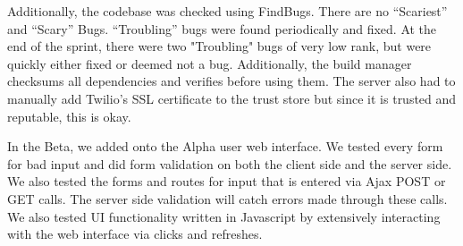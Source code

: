 \documentclass{article}
\begin{document}
\par Additionally, the codebase was checked using FindBugs. There are no ``Scariest'' and ``Scary'' Bugs. ``Troubling'' bugs were found periodically and fixed. At the end of the sprint, there were two "Troubling" bugs of very low rank, but were quickly either fixed or deemed not a bug. Additionally, the build manager checksums all dependencies and verifies before using them. The server also had to manually add Twilio's SSL certificate to the trust store but since it is trusted and reputable, this is okay.

\par In the Beta, we added onto the Alpha user web interface. We tested every form for bad input and did form validation on both the client side and the server side. We also tested the forms and routes for input that is entered via Ajax POST or GET calls. The server side validation will catch errors made through these calls. We also tested UI functionality written in Javascript by extensively interacting with the web interface via clicks and refreshes.
\end{document}
